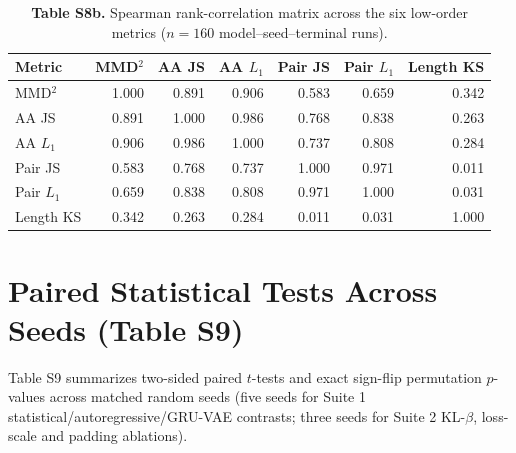 \documentclass[11pt,a4paper]{article}
\newcommand{\rev}[1]{#1}
\begin{document}
\begin{table}[H]
\centering\footnotesize
\caption*{\rev{\textbf{Table S8b.} Spearman rank-correlation matrix across the six low-order metrics ($n=160$ model--seed--terminal runs).}}
\begin{tabular}{lrrrrrr}
\toprule
Metric & MMD$^2$ & AA JS & AA $L_1$ & Pair JS & Pair $L_1$ & Length KS \\
\midrule
MMD$^2$ & 1.000 & 0.891 & 0.906 & 0.583 & 0.659 & 0.342 \\
AA JS & 0.891 & 1.000 & 0.986 & 0.768 & 0.838 & 0.263 \\
AA $L_1$ & 0.906 & 0.986 & 1.000 & 0.737 & 0.808 & 0.284 \\
Pair JS & 0.583 & 0.768 & 0.737 & 1.000 & 0.971 & 0.011 \\
Pair $L_1$ & 0.659 & 0.838 & 0.808 & 0.971 & 1.000 & 0.031 \\
Length KS & 0.342 & 0.263 & 0.284 & 0.011 & 0.031 & 1.000 \\
\bottomrule
\end{tabular}
\end{table}

\FloatBarrier
\section{\rev{Paired Statistical Tests Across Seeds (Table S9)}}
\rev{Table S9 summarizes two-sided paired $t$-tests and exact sign-flip permutation $p$-values across matched random seeds (five seeds for Suite 1 statistical/autoregressive/GRU-VAE contrasts; three seeds for Suite 2 KL-$\beta$, loss-scale and padding ablations).}
\end{document}
